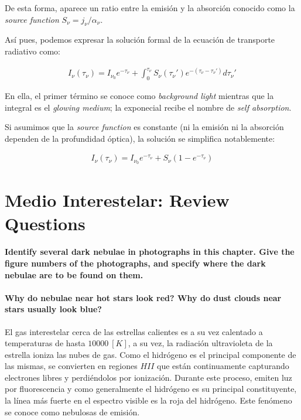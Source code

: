 \documentclass{tufte-handout}
\begin{document}
De esta forma, aparece un ratio entre la emisión y la absorción conocido como la \emph{source function} $ S_\nu = j_\nu / \alpha_\nu$.

Así pues, podemos expresar la solución formal de la ecuación de transporte radiativo como:

\begin{align}
I_\nu(\tau_\nu) = I_{\nu_0}e^{-\tau_\nu} + \int_0^{\tau_\nu} S_\nu(\tau_\nu')e^{-(\tau_\nu - \tau_\nu')}d\tau_\nu'
\end{align}

En ella, el primer término se conoce como \emph{background light} mientras que la integral es el \emph{glowing medium}; la exponecial recibe el nombre de \emph{self absorption}.

Si asumimos que la \emph{source function} es constante (ni la emisión ni la absorción dependen de la profundidad óptica), la solución se simplifica notablemente:

\begin{align}
I_\nu(\tau_\nu) = I_{\nu_0}e^{-\tau_\nu} + S_\nu (1-e^{-\tau_\nu})
\end{align}

\section{Medio Interestelar: Review Questions}

\paragraph{Identify several dark nebulae in photographs in this chapter. Give the figure numbers of the photographs,
and specify where the dark nebulae are to be found on them.}

\paragraph{\textbf{Why do nebulae near hot stars look red? Why do dust clouds near stars usually look blue?}}

El gas interestelar cerca de las estrellas calientes es a su vez calentado a temperaturas de hasta $10000~[K]$, a su vez, la radiación ultravioleta de la estrella ioniza las nubes de gas. Como el hidrógeno es el principal componente de las mismas, se convierten en regiones $HII$ que están continuamente capturando electrones libres y perdiéndolos por ionización. Durante este proceso, emiten luz por fluorescencia y como generalmente el hidrógeno es su principal constituyente, la línea más fuerte en el espectro visible es la roja del hidrógeno. Este fenómeno se conoce como nebulosas de emisión.
\end{document}
